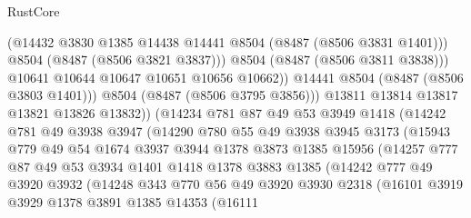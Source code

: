 \begin{lexlean}{RustCore}
\begin{coremodule}
                              (@14432 @3830 @1385 @14438 @14441 @8504 (@8487 (@8506 @3831 @1401)))
                              @8504
                              (@8487 (@8506 @3821 @3837)))
                            @8504
                            (@8487 (@8506 @3811 @3838)))
                          @10641
                          @10644
                          @10647
                          @10651
                          @10656
                          @10662))
                      @14441
                      @8504
                      (@8487 (@8506 @3803 @1401)))
                    @8504
                    (@8487 (@8506 @3795 @3856)))
                  @13811
                  @13814
                  @13817
                  @13821
                  @13826
                  @13832))
              (@14234
                @781
                @87
                @49
                @53
                @3949
                @1418
                (@14242
                  @781
                  @49
                  @3938
                  @3947
                  (@14290
                    @780
                    @55
                    @49
                    @3938
                    @3945
                    @3173
                    (@15943
                      @779
                      @49
                      @54
                      @1674
                      @3937
                      @3944
                      @1378
                      @3873
                      @1385
                      @15956
                      (@14257
                        @777
                        @87
                        @49
                        @53
                        @3934
                        @1401
                        @1418
                        @1378
                        @3883
                        @1385
                        (@14242
                          @777
                          @49
                          @3920
                          @3932
                          (@14248
                            @343
                            @770
                            @56
                            @49
                            @3920
                            @3930
                            @2318
                            (@16101
                              @3919
                              @3929
                              @1378
                              @3891
                              @1385
                              @14353
                              (@16111

\end{coremodule}
\end{lexlean}
